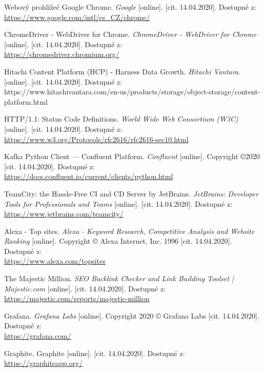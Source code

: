 \documentclass[thesis=M,czech,hidelinks]{FITthesis}[2013/05/06]
\begin{document}
\begin{thebibliography}{9}
	Webový prohlížeč Google Chrome. \textit{Google} [online]. [cit. 14.04.2020]. Dostupné z:  \\ 
	\url{https://www.google.com/intl/cs_CZ/chrome/}
	
	ChromeDriver - WebDriver for Chrome. \textit{ChromeDriver - WebDriver for Chrome} [online]. [cit. 14.04.2020]. Dostupné z: \\ 
	\url{https://chromedriver.chromium.org/}
	
	Hitachi Content Platform (HCP) - Harness Data Growth. \textit{Hitachi Vantara.} [online]. [cit. 14.04.2020]. Dostupné z: \\ https://www.hitachivantara.com/en-us/products/storage/object-storage/content-platform.html
	
	HTTP/1.1: Status Code Definitions. \textit{World Wide Web Consortium (W3C)} [online]. [cit. 14.04.2020]. Dostupné z: \\ 
	\url{https://www.w3.org/Protocols/rfc2616/rfc2616-sec10.html}
	
	Kafka Python Client — Confluent Platform. \textit{Confluent} [online]. Copyright ©2020 [cit. 14.04.2020]. Dostupné z:  \\ 
	\url{https://docs.confluent.io/current/clients/python.html}
	
	TeamCity: the Hassle-Free CI and CD Server by JetBrains. \textit{JetBrains: Developer Tools for Professionals and Teams} [online]. [cit. 14.04.2020]. Dostupné z: \\ 
	\url{https://www.jetbrains.com/teamcity/}
	
	Alexa - Top sites. \textit{Alexa - Keyword Research, Competitive Analysis and Website Ranking} [online]. Copyright © Alexa Internet, Inc. 1996 [cit. 14.04.2020]. Dostupné z:  \\ 
	\url{https://www.alexa.com/topsites}
	
	The Majestic Million. \textit{SEO Backlink Checker and Link Building Toolset | Majestic.com} [online]. [cit. 14.04.2020]. Dostupné z:  \\ 
	\url{https://majestic.com/reports/majestic-million}
	
	Grafana. \textit{Grafana Labs} [online]. Copyright 2020 © Grafana Labs [cit. 14.04.2020]. Dostupné z: \\
	\url{https://grafana.com/}
	
	Graphite. Graphite [online]. [cit. 14.04.2020]. Dostupné z: \\
	\url{https://graphiteapp.org/}
	

\end{thebibliography}
\end{document}

